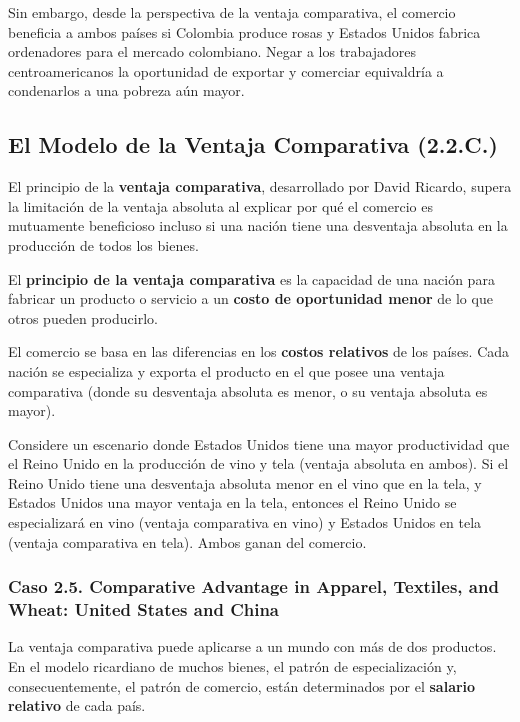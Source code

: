 Sin embargo, desde la perspectiva de la ventaja comparativa, el comercio beneficia a ambos países si Colombia produce rosas y Estados Unidos fabrica ordenadores para el mercado colombiano. Negar a los trabajadores centroamericanos la oportunidad de exportar y comerciar equivaldría a condenarlos a una pobreza aún mayor.

\subsection{El Modelo de la Ventaja Comparativa (2.2.C.)}
El principio de la \textbf{ventaja comparativa}, desarrollado por David Ricardo, supera la limitación de la ventaja absoluta al explicar por qué el comercio es mutuamente beneficioso incluso si una nación tiene una desventaja absoluta en la producción de todos los bienes.

\begin{definicion}
El \textbf{principio de la ventaja comparativa} es la capacidad de una nación para fabricar un producto o servicio a un \textbf{costo de oportunidad menor} de lo que otros pueden producirlo.
\end{definicion}

El comercio se basa en las diferencias en los \textbf{costos relativos} de los países. Cada nación se especializa y exporta el producto en el que posee una ventaja comparativa (donde su desventaja absoluta es menor, o su ventaja absoluta es mayor).

\begin{ejemplo}
Considere un escenario donde Estados Unidos tiene una mayor productividad que el Reino Unido en la producción de vino y tela (ventaja absoluta en ambos). Si el Reino Unido tiene una desventaja absoluta menor en el vino que en la tela, y Estados Unidos una mayor ventaja en la tela, entonces el Reino Unido se especializará en vino (ventaja comparativa en vino) y Estados Unidos en tela (ventaja comparativa en tela). Ambos ganan del comercio.
\end{ejemplo}

\subsubsection{Caso 2.5. Comparative Advantage in Apparel, Textiles, and Wheat: United States and China}
La ventaja comparativa puede aplicarse a un mundo con más de dos productos. En el modelo ricardiano de muchos bienes, el patrón de especialización y, consecuentemente, el patrón de comercio, están determinados por el \textbf{salario relativo} de cada país.

